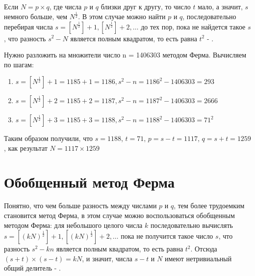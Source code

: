   Если $N = p \times q$, где числа $p$ и $q$ близки друг к другу, то число $t$ мало, а значит, $s$ немного больше,
  чем $N^{\frac{1}{2}}$. В этом случае можно найти $p$ и $q$, последовательно перебирая числа
  $s=[N^{ \frac{1}{2}}]+1, [N^{ \frac{1}{2}}]+2, \dots$ до тех пор, пока не найдется 
  такое $s$, что разность $s^{ 2} - N$ является полным квадратом, то есть равна $t^{ 2}$ - 
  \cite[Глава 6.4, страницы 216-225]{mah06}.
  
  \begin{example}
    Нужно разложить на множители число n = 1406303 методом Ферма. Вычисляем по шагам:
	\begin{enumerate}
	\item $s = [N^{ \frac{1}{2}}] + 1 = 1185 + 1 = 1186, s^{2} - n = 1186^{2} - 1406303 = 293$
	\item $s = [N^{ \frac{1}{2}}] + 2 = 1185 + 2 = 1187, s^{2} - n = 1187^{2} - 1406303 = 2666$
	\item $s = [N^{ \frac{1}{2}}] + 3 = 1185 + 3 = 1188, s^{2} - n = 1188^{2} - 1406303 = 71^{2}$
	\end{enumerate}

    Таким образом получили, что $s = 1188$, $t = 71$, $p = s - t = 1117$, $q = s + t = 1259$, как результат 
    $N = 1117 \times 1259$
  \end{example}


\section{Обобщенный метод Ферма}

  \paragraph{} Понятно, что чем больше разность между числами $p$ и $q$, тем более трудоемким становится метод Ферма, в этом случае 
  можно воспользоваться обобщенным методом Ферма: для небольшого целого числа $k$ последовательно вычислять 
  $s = [(kN)^{ \frac{1}{2}}] + 1, [(kN)^{ \frac{1}{2}}] + 2, \dots$ пока не получится такое число $s$, 
  что разность $s^{2} - kn$ является полным квадратом, то есть равна $t^{2}$. Отсюда
  $(s + t)\times(s - t) = kN$, и значит, числа $s - t$ и $N$ имеют нетривиальный общий делитель - 
  \cite[Глава 2.1, страницы 51-53]{ish11}.
  
